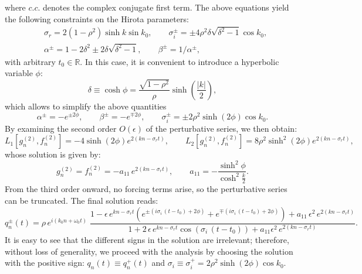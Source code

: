 \documentclass{article}
\def\RR{\mathbb R}
\begin{document}
where $c.c.$ denotes the complex conjugate first term. The above equations yield the following constraints on the Hirota parameters:
\begin{equation*}
    \begin{split}
        &\sigma_r=2(1-\rho^2)\sinh k\sin k_0, \qquad \sigma_i^\pm=\pm 4\rho^2\delta\sqrt{\delta^2-1}\cos k_0,\\
        &\alpha^\pm=1-2\delta^2\pm 2\delta\sqrt{\delta^2-1},\qquad \beta^\pm =1/\alpha^{\pm},
    \end{split}
\end{equation*}
with arbitrary $t_0\in\RR$. In this case, it is convenient to introduce a hyperbolic variable $\phi$:
\begin{equation}\label{phi}
  \delta\equiv\cosh\phi= \frac{  \sqrt{1-\rho^2}}{\rho}\sinh\left(\frac{|k|}{2}\right),
\end{equation}
which allows to simplify the above quantities 
\begin{equation}
\alpha^\pm=-e^{\pm 2\phi}, \qquad \beta^\pm =-e^{\mp 2\phi}, \qquad \sigma_i^\pm=\pm 2\rho^2\sinh(2\phi)\cos k_0. 
\end{equation}
By examining the second order $O(\epsilon)$ of the perturbative series, we then obtain:
\begin{equation}
L_1[g_n^{(2)},f_n^{(2)}]=-4\sinh(2\phi)e^{2(kn-\sigma_r t)}, \qquad 
L_2[g_n^{(2)},f_n^{(2)}]=8\rho^2\sinh^2(2\phi)e^{2(kn-\sigma_r t)},
\end{equation}
whose solution is given by:
\begin{equation}
    g_n^{(2)}=f_n^{(2)}=-a_{11}\,e^{2(k n -\sigma_r t)}, \qquad a_{11}=-\frac{\sinh^2 \phi}{\cosh^2\frac{k}{2}}.
\end{equation} 
From the third order onward, no forcing terms arise, so the perturbative series can be truncated. The final solution reads: 
\begin{equation}
     q_n^{\pm}(t)=\rho\,e^{i(k_0 n+\omega_0 t)}\;\frac{1-\epsilon\, e^{ k n-\sigma_r t} \left(e^{\pm (i\sigma_i\,(t-t_0)+ 2\phi)}+e^{\mp (i\sigma_i\,(t-t_0)+2\phi)}\right)+a_{11}\,\epsilon^2\,e^{2(k n -\sigma_r t)}}{1+2\, \epsilon\,  e^{ k n-\sigma_r t}\cos(\sigma_i\,(t-t_0))+a_{11}\epsilon^2 \,e^{2(k n -\sigma_r t)}}.
\end{equation}
It is easy to see that the different signs in the solution are irrelevant; therefore, without loss of generality, we proceed with the analysis by choosing the solution with the positive sign: $q_n(t)\equiv q_n^{+}(t)$ and $\sigma_i\equiv\sigma_i^{+}=2\rho^2\sinh(2\phi)\cos k_0$.
\end{document}
